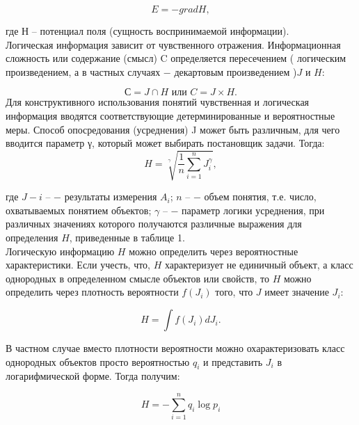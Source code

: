 \documentclass[a4paper,12pt]{report}
\begin{document}
	\begin{equation}
\label{trivial}
E  = - grad H,
\end{equation} 

где $Н$ – потенциал поля (сущность воспринимаемой информации).\\

	Логическая информация зависит от чувственного отражения. Информационная сложность или содержание (смысл) C определяется пересечением ( логическим произведением, а в частных случаях − декартовым произведением )$J$ и $H$:

	\begin{equation}
\label{trivial}
 С = J \cap  H \mbox{ или } C = J \times H.		
\end{equation}						
	Для конструктивного использования понятий чувственная и логическая информация вводятся соответствующие детерминированные и вероятностные меры. Способ опосредования (усреднения) J может быть различным, для чего вводится параметр γ, который может выбирать постановщик задачи. Тогда:
	\begin{equation}
\label{trivial}
 H = \sqrt[ \gamma ]{ \frac{1}{n} \sum_{i = 1}^n J_i^\gamma}  , 
\end{equation}										 

где $J-i \mbox{ –}$ − результаты измерения $A_i$; $n \mbox{ –}$ − объем понятия, т.е. число, охватываемых понятием объектов; $\gamma \mbox{ –}$ − параметр логики усреднения, при различных значениях которого получаются различные выражения для определения $H$, приведенные в таблице 1.\\
	Логическую информацию $H$ можно определить через вероятностные характеристики. Если учесть, что, $H$ характеризует не единичный объект, а класс однородных в определенном смысле объектов или свойств, то $H$ можно определить через плотность вероятности $f(J_i)$ того, что $J$ имеет значение $J_i$:

	\begin{equation}
\label{trivial}
H = \int f( J_i)dJ_i  .
\end{equation} 										

	В частном случае вместо плотности вероятности можно охарактеризовать класс однородных объектов просто вероятностью $q_i$ и представить $J_i$ в логарифмической форме. Тогда получим:

	\begin{equation}
\label{trivial}
H =  -\sum_{i = 1}^{n}q_i \log p_i
\end{equation} 
\end{document}
